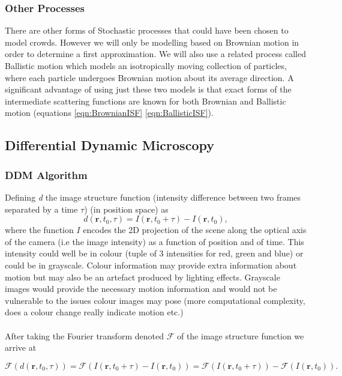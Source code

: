\documentclass[10pt]{article}
\begin{document}
\subsubsection{Other Processes}
There are other forms of Stochastic processes that could have been chosen to model crowds. However we will only be modelling based on Brownian motion in order to determine a first approximation. We will also use a related process called Ballistic motion which models an isotropically moving collection of particles, where each particle undergoes Brownian motion about its average direction. A significant advantage of using just these two models is that exact forms of the intermediate scattering functions are known for both Brownian and Ballistic motion (equations \ref{eqn:BrownianISF} \ref{eqn:BallisticISF}). 

\subsection{Differential Dynamic Microscopy}
\subsubsection{DDM Algorithm}
Defining \textit{d} the image structure function (intensity difference between two frames separated by a time $\tau$) (in position space) as
\begin{equation}
    d(\textbf{r}, t_0, \tau) = I(\mathbf{r}, t_0 + \tau) - I(\mathbf{r}, t_0),
\end{equation}
where the function $\textit{I}$ encodes the 2D projection of the scene along the optical axis of the camera (i.e the image intensity) as a function of position and of time. This intensity could well be in colour (tuple of 3 intensities for red, green and blue) or could be in grayscale. Colour information may provide extra information about motion but may also be an artefact produced by lighting effects. Grayscale images would provide the necessary motion information and would not be vulnerable to the issues colour images may pose (more computational complexity, does a colour change really indicate motion etc.)
\\\\
After taking the Fourier transform denoted $ \mathscr{F}$ of the image structure function we arrive at

\begin{equation}
    \mathscr{F} (d(\textbf{r}, t_0, \tau) ) = \mathscr{F} (I(\mathbf{r}, t_0 + \tau) - I(\mathbf{r}, t_0)) = \mathscr{F}(I(\mathbf{r}, t_0 + \tau)) - \mathscr{F}(I(\mathbf{r}, t_0)).
\end{equation}
\end{document}
